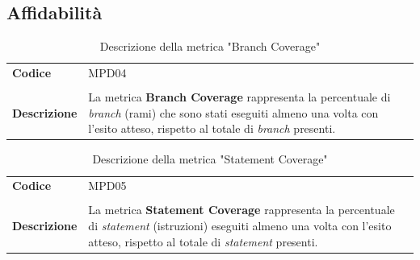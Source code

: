 \documentclass[a4paper,12pt]{article}
\begin{document}
        \subsection{Affidabilità}

        {\renewcommand{\arraystretch}{1.4}
            \begin{table}[H]
            \centering
            \begin{tabularx}{\textwidth}{|l|X|}
                \hline
                \rowcolor{gold}
                \multicolumn{2}{|c|}{\textbf{Branch Coverage}}\\
                \hline
                \textbf{Codice} & MPD04 \\
                \hline
                \raisebox{0.6\height}{\textbf{Formula}} &  \rule{0pt}{5ex}\raisebox{0.3\height}{\( \displaystyle \text{Branch Coverage} = \frac{\text{Branch eseguiti}}{\text{Branch totali}}*100 \)}\\
                \hline
                \textbf{Descrizione} & La metrica \textbf{Branch Coverage} rappresenta la percentuale di \textit{branch} (rami) che sono stati eseguiti almeno una volta con l'esito atteso, rispetto al totale di \textit{branch} presenti. \\
                \hline
            \end{tabularx}      
            \caption{Descrizione della metrica "Branch Coverage"}
            \end{table}
        }

        {\renewcommand{\arraystretch}{1.4}
            \begin{table}[H]
            \centering
            \begin{tabularx}{\textwidth}{|l|X|}
                \hline
                \rowcolor{gold}
                \multicolumn{2}{|c|}{\textbf{Statement Coverage}}\\
                \hline
                \textbf{Codice} & MPD05 \\
                \hline
                \raisebox{0.6\height}{\textbf{Formula}} &  \rule{0pt}{5ex}\raisebox{0.3\height}{\( \displaystyle \text{Statement Coverage} = \frac{\text{Statement eseguiti}}{\text{Statement totali}}*100 \)}\\
                \hline
                \textbf{Descrizione} & La metrica \textbf{Statement Coverage} rappresenta la percentuale di \textit{statement} (istruzioni) eseguiti almeno una volta con l'esito atteso, rispetto al totale di \textit{statement} presenti. \\
                \hline
            \end{tabularx}      
            \caption{Descrizione della metrica "Statement Coverage"}
            \end{table}
        }
\end{document}
